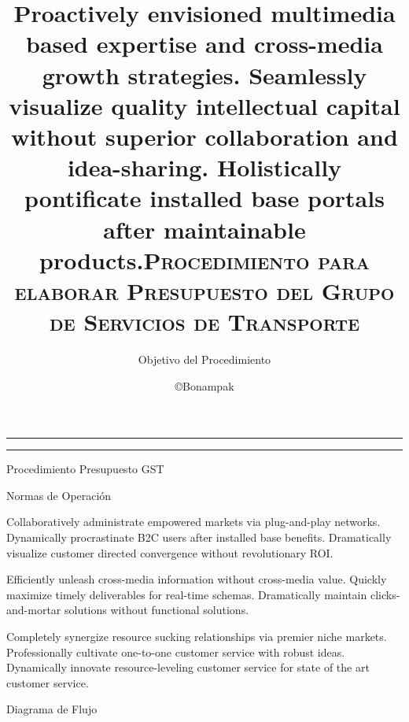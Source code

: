 \documentclass[12pt,letterpaper]{article}
\author{Objetivo del Procedimiento}
\title{Proactively envisioned multimedia based expertise and cross-media growth strategies. Seamlessly visualize quality intellectual capital without superior collaboration and idea-sharing. Holistically pontificate installed base portals after maintainable products.}
\makeatletter
\def\makecaratula{%
  \null
  \thispagestyle{empty}%
  
  
  \vskip 1cm
  \begin{flushright}
    \scshape\Large\@author
  \end{flushright}
  \vfil
  \hrule height 2pt
  \par
  \begin{center}
    \normalfont \strut \@title \par
  \end{center}
  \hrule height 2pt
  \par
  \vfil
  \vfil
  \null
  \cleardoublepage
  }
\makeatother
\begin{document}
\makecaratula
\newpage

 {\sffamily %
  \title{\scshape Procedimiento para elaborar Presupuesto del Grupo de Servicios de Transporte}
  \author{\copyright Bonampak}
  \maketitle

  \tableofcontents

  \newpage
  \begin{section}
  {\color{kblue} Procedimiento Presupuesto GST}

    \begin{subsection}
    {\color{kgreen}Normas de Operaci\'on}
    
    	Collaboratively administrate empowered markets via plug-and-play networks. Dynamically procrastinate B2C users after installed base benefits. Dramatically visualize customer directed convergence without revolutionary ROI.

		Efficiently unleash cross-media information without cross-media value. Quickly maximize timely deliverables for real-time schemas. Dramatically maintain clicks-and-mortar solutions without functional solutions.

		Completely synergize resource sucking relationships via premier niche markets. Professionally cultivate one-to-one customer service with robust ideas. Dynamically innovate resource-leveling customer service for state of the art customer service.
		\\
    \end{subsection}

  \newpage
    \begin{subsection}
		{\color{kgray}Diagrama de Flujo}
  \begin{center}
  

\end{center}
\end{subsection}
\end{section}}
\end{document}
